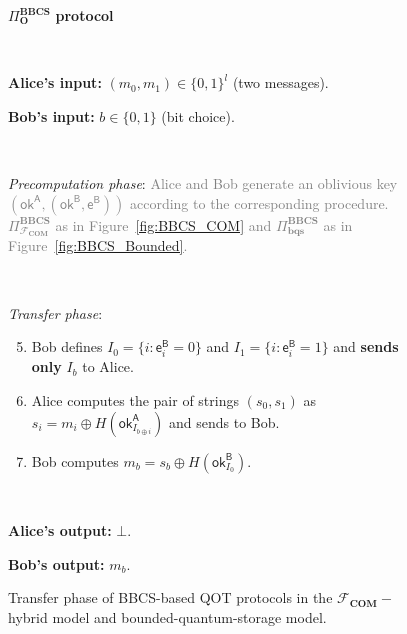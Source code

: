 \begin{figure}[h!]
    \centering
        \begin{tcolorbox}
            
            \centerline{$\Pi^{\textbf{BBCS}}_{\textbf{O}}$ \textbf{protocol}}
            
            \
            
            \textbf{Alice's input:} $(m_0, m_1)\in\{0,1\}^l$ (two messages). 
            
            \textbf{Bob's input:} $b\in\{0,1\}$ (bit choice).
            
            \
            

            
            \textit{Precomputation phase}: \textcolor{gray}{Alice and Bob generate an oblivious key $(\mathsf{ok}^{\mathsf{A}}, (\mathsf{ok}^{\mathsf{B}}, \mathsf{e}^{\mathsf{B}}))$ according to the corresponding procedure. $\Pi^{\textbf{BBCS}}_{\mathcal{F}_{\textbf{COM}}}$ as in Figure~\ref{fig:BBCS_COM} and $\Pi^{\textbf{BBCS}}_{\textbf{bqs}}$ as in Figure~\ref{fig:BBCS_Bounded}.}
            
            \
            
            \textit{Transfer phase}:
            \begin{enumerate}
            \setcounter{enumi}{4}
                \item Bob defines $I_0 = \{ i : \mathsf{e}^{\mathsf{B}}_i = 0 \}$ and $I_1 = \{ i : \mathsf{e}^{\mathsf{B}}_i = 1 \}$ and \textbf{sends only} $I_b$ to Alice.
                \item Alice computes the pair of strings $(s_0, s_1)$ as $s_i = m_i \oplus H(\mathsf{ok}^{\mathsf{A}}_{I_{b\oplus i}})$ and sends to Bob.
                \item Bob computes $m_b = s_b \oplus  H(\mathsf{ok}^{\mathsf{B}}_{I_0})$. 
            \end{enumerate}
            
            \
            
        \textbf{Alice's output:} $\bot$.
        
        \textbf{Bob's output:} $m_b$.
        
        \end{tcolorbox}
    \caption{Transfer phase of BBCS-based QOT protocols in the $\mathcal{F}_{\mathbf{COM}}-$hybrid model and bounded-quantum-storage model.}
    \label{fig:BBCS_Transfer-optimized}
\end{figure}


